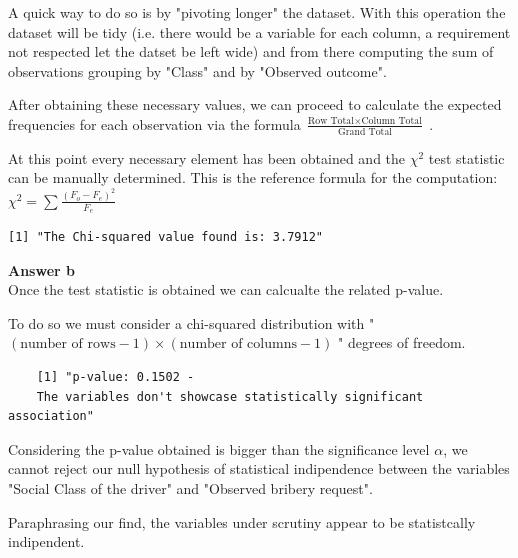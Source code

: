 \documentclass[12pt,letterpaper]{article}
\begin{document}
\noindent A quick way to do so is by "pivoting longer" the dataset. With this operation the dataset will be tidy (i.e. there would be a variable for each column, a requirement not respected let the datset be left wide) and from there computing the sum of observations grouping by "Class" and by "Observed outcome". 

\noindent After obtaining these necessary values, we can proceed to calculate the expected frequencies for each observation via the formula $\frac{\text{Row Total} \times \text{Column Total}}{\text{Grand Total}}$ . 
\vspace{0.5cm}
  
\vspace{0.5cm}
\noindent At this point every necessary element has been obtained and the $\chi^2$ test statistic can be manually determined. This is the reference formula for the computation: $\chi^2 = \sum \frac{(F_o - F_e)^2}{F_e}$
\vspace{0.5cm}
 
\begin{verbatim}
[1] "The Chi-squared value found is: 3.7912"
\end{verbatim}

\vspace{0.5cm}
\noindent\textbf{Answer b}\\
\vspace{0.5cm}
\noindent Once the test statistic is obtained we can calcualte the related p-value.

\noindent To do so we must consider a chi-squared distribution with " $(\text{number of rows} - 1) \times (\text{number of columns} - 1)$ " degrees of freedom.
\vspace{0.5cm}

\begin{verbatim}
	[1] "p-value: 0.1502 - 
	The variables don't showcase statistically significant association"
\end{verbatim}
\vspace{0.5cm}
\noindent Considering the p-value obtained is bigger than the significance level $\alpha$, we cannot reject our null hypothesis of statistical indipendence between the variables "Social Class of the driver" and "Observed bribery request". 

\noindent Paraphrasing our find, the variables under scrutiny appear to be statistcally indipendent.  
\end{document}
